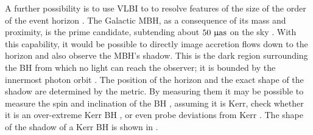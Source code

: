 
A further possibility is to use VLBI to to resolve features of the size of the order of the event horizon \citep{Doeleman2008,Fish2010}. The Galactic MBH, as a consequence of its mass and proximity, is the prime candidate, subtending about $50~\mathrm{\upmu as}$ on the sky \citep{Broderick2009,Johannsen2012a}. With this capability, it would be possible to directly image accretion flows down to the horizon and also observe the MBH's shadow. This is the dark region surrounding the BH from which no light can reach the observer; it is bounded by the innermost photon orbit \citep[section 63]{Chandrasekhar1992}. The position of the horizon and the exact shape of the shadow are determined by the metric. By measuring them it may be possible to measure the spin and inclination of the BH \citep{Hioki2009a}, assuming it is Kerr, check whether it is an over-extreme Kerr BH \citep{Bambi2009}, or even probe deviations from Kerr \citep{Johannsen2010a, Johannsen2010b}.%
The shape of the shadow of a Kerr BH is shown in .
